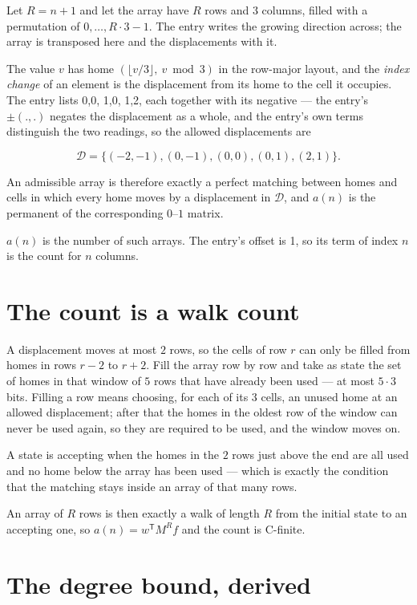 \documentclass[11pt]{article}
\theoremstyle{definition}
\begin{document}
Let $R = n + 1$ and let the array have $R$ rows and $3$ columns, filled with a permutation of $0,\dots,R\cdot3-1$. The entry writes the growing direction across; the array is transposed here and the displacements with it.

The value $v$ has home $(\lfloor v/3\rfloor,\ v \bmod 3)$ in the row-major layout, and the {\itshape index change} of an element is the displacement from its home to the cell it occupies. The entry lists 0,0, 1,0, 1,2, each together with its negative --- the entry's $\pm(.,.)$ negates the displacement as a whole, and the entry's own terms distinguish the two readings, so the allowed displacements are

\[\mathcal{D} = \{(-2,-1), (0,-1), (0,0), (0,1), (2,1)\}.\]

An admissible array is therefore exactly a perfect matching between homes and cells in which every home moves by a displacement in $\mathcal{D}$, and $a(n)$ is the permanent of the corresponding $0$--$1$ matrix.

$a(n)$ is the number of such arrays. The entry's offset is 1, so its term of index $n$ is the count for $n$ columns.

\section{The count is a walk count}

A displacement moves at most $2$ rows, so the cells of row $r$ can only be filled from homes in rows $r-2$ to $r+2$. Fill the array row by row and take as state the set of homes in that window of $5$ rows that have already been used --- at most $5\cdot3$ bits. Filling a row means choosing, for each of its $3$ cells, an unused home at an allowed displacement; after that the homes in the oldest row of the window can never be used again, so they are required to be used, and the window moves on.

A state is accepting when the homes in the $2$ rows just above the end are all used and no home below the array has been used --- which is exactly the condition that the matching stays inside an array of that many rows.

An array of $R$ rows is then exactly a walk of length $R$ from the initial state to an accepting one, so $a(n) = w^{\mathsf T}M^{R}f$ and the count is C-finite.

\section{The degree bound, derived}
\end{document}
